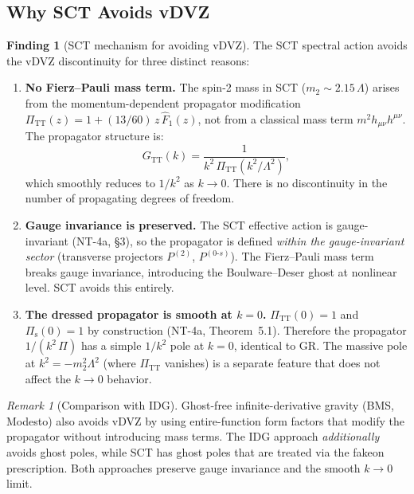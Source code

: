 \documentclass[11pt,a4paper]{article}
\theoremstyle{plain}
\theoremstyle{definition}
\newtheorem{finding}[theorem]{Finding}
\theoremstyle{remark}
\newtheorem{remark}[theorem]{Remark}
\begin{document}
\subsection{Why SCT Avoids vDVZ}

\begin{finding}[SCT mechanism for avoiding vDVZ]\label{find:sct-vdvz}
The SCT spectral action avoids the vDVZ discontinuity for three
distinct reasons:
\begin{enumerate}[nosep]
  \item \textbf{No Fierz--Pauli mass term.}  The spin-2 mass in SCT
    ($m_2 \sim 2.15\,\Lambda$) arises from the momentum-dependent
    propagator modification $\Pi_{\mathrm{TT}}(z) = 1 + (13/60)\,z\,
    \hat{F}_1(z)$, not from a classical mass term $m^2 h_{\mu\nu}
    h^{\mu\nu}$.  The propagator structure is:
    \begin{equation}
      G_{\mathrm{TT}}(k) = \frac{1}{k^2\,\Pi_{\mathrm{TT}}(k^2/\Lambda^2)},
    \end{equation}
    which smoothly reduces to $1/k^2$ as $k \to 0$.  There is
    no discontinuity in the number of propagating degrees of
    freedom.

  \item \textbf{Gauge invariance is preserved.}  The SCT effective
    action is gauge-invariant (NT-4a, \S3), so the propagator is
    defined \emph{within the gauge-invariant sector} (transverse
    projectors $P^{(2)}$, $P^{(0\text{-}s)}$).  The
    Fierz--Pauli mass term breaks gauge invariance, introducing
    the Boulware--Deser ghost at nonlinear level.  SCT avoids
    this entirely.

  \item \textbf{The dressed propagator is smooth at $k = 0$.}
    $\Pi_{\mathrm{TT}}(0) = 1$ and $\Pi_{\mathrm{s}}(0) = 1$
    by construction (NT-4a, Theorem~5.1).  Therefore the
    propagator $1/(k^2\,\Pi)$ has a simple $1/k^2$ pole at
    $k = 0$, identical to GR.  The massive pole at
    $k^2 = -m_2^2 \Lambda^2$ (where $\Pi_{\mathrm{TT}}$
    vanishes) is a separate feature that does not affect the
    $k \to 0$ behavior.
\end{enumerate}
\end{finding}

\begin{remark}[Comparison with IDG]
Ghost-free infinite-derivative gravity (BMS, Modesto) also avoids
vDVZ by using entire-function form factors that modify the
propagator without introducing mass terms.  The IDG approach
\emph{additionally} avoids ghost poles, while SCT has ghost poles
that are treated via the fakeon prescription.  Both approaches
preserve gauge invariance and the smooth $k \to 0$ limit.
\end{remark}
\end{document}
